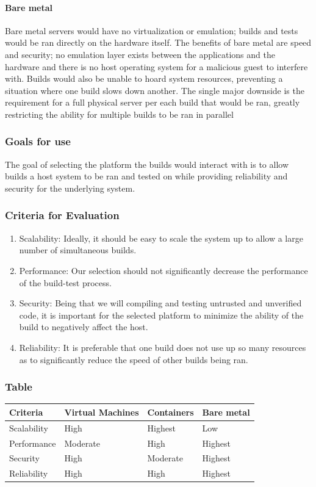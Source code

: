 \documentclass[10pt,letterpaper,onecolumn,draftclsnofoot]{IEEEtran}
\begin{document}
\paragraph{Bare metal}
Bare metal servers would have no virtualization or emulation; builds and tests would be ran directly on the hardware itself. The benefits of bare metal are speed and security; no emulation layer exists between the applications and the hardware and there is no host operating system for a malicious guest to interfere with. Builds would also be unable to hoard system resources, preventing a situation where one build slows down another. The single major downside is the requirement for a full physical server per each build that would be ran, greatly restricting the ability for multiple builds to be ran in parallel
\subsubsection{Goals for use}
The goal of selecting the platform the builds would interact with is to allow builds a host system to be ran and tested on while providing reliability and security for the underlying system.
\subsubsection{Criteria for Evaluation}
\begin{enumerate}
  \item Scalability: Ideally, it should be easy to scale the system up to allow a large number of simultaneous builds.
  \item Performance: Our selection should not significantly decrease the performance of the build-test process.
  \item Security: Being that we will compiling and testing untrusted and unverified code, it is important for the selected platform to minimize the ability of the build to negatively affect the host.
  \item Reliability: It is preferable that one build does not use up so many resources as to significantly reduce the speed of other builds being ran.
\end{enumerate}
\subsubsection{Table}
\begin{center}
  \begin{tabular}{llll}
    Criteria & Virtual Machines & Containers & Bare metal \\ \midrule
    Scalability       & High & Highest & Low \\ \midrule
    Performance           & Moderate & High & Highest \\ \midrule
    Security       & High & Moderate & Highest \\ \midrule
    Reliability  & High & High & Highest \\ \bottomrule
  \end{tabular}
\end{center}
\end{document}
